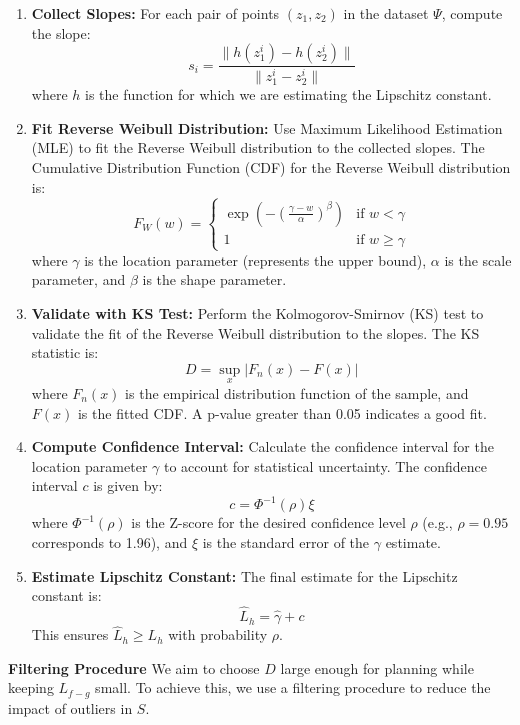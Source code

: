 \documentclass{article}
\begin{document}
\begin{enumerate}
    \item \textbf{Collect Slopes:} For each pair of points \((z_1, z_2)\) in the dataset \(\Psi\), compute the slope:
    \[
    s_i = \frac{\|h(z_1^i) - h(z_2^i)\|}{\|z_1^i - z_2^i\|}
    \]
    where \(h\) is the function for which we are estimating the Lipschitz constant.

    \item \textbf{Fit Reverse Weibull Distribution:} Use Maximum Likelihood Estimation (MLE) to fit the Reverse Weibull distribution to the collected slopes. The Cumulative Distribution Function (CDF) for the Reverse Weibull distribution is:
    \[
    F_W(w) = \begin{cases} 
    \exp \left( - \left( \frac{\gamma - w}{\alpha} \right)^\beta \right) & \text{if } w < \gamma \\
    1 & \text{if } w \geq \gamma 
    \end{cases}
    \]
    where \(\gamma\) is the location parameter (represents the upper bound), \(\alpha\) is the scale parameter, and \(\beta\) is the shape parameter.

    \item \textbf{Validate with KS Test:} Perform the Kolmogorov-Smirnov (KS) test to validate the fit of the Reverse Weibull distribution to the slopes. The KS statistic is:
    \[
    D = \sup_x |F_n(x) - F(x)|
    \]
    where \(F_n(x)\) is the empirical distribution function of the sample, and \(F(x)\) is the fitted CDF. A p-value greater than 0.05 indicates a good fit.

    \item \textbf{Compute Confidence Interval:} Calculate the confidence interval for the location parameter \(\gamma\) to account for statistical uncertainty. The confidence interval \(c\) is given by:
    \[
    c = \Phi^{-1}(\rho) \xi
    \]
    where \(\Phi^{-1}(\rho)\) is the Z-score for the desired confidence level \(\rho\) (e.g., \(\rho = 0.95\) corresponds to 1.96), and \(\xi\) is the standard error of the \(\gamma\) estimate.

    \item \textbf{Estimate Lipschitz Constant:} The final estimate for the Lipschitz constant is:
    \[
    \hat{L}_h = \hat{\gamma} + c
    \]
    This ensures \(\hat{L}_h \geq L_h\) with probability \(\rho\).
\end{enumerate}

\textbf{Filtering Procedure}
We aim to choose \( D \) large enough for planning while keeping \( L_{f-g} \) small. To achieve this, we use a filtering procedure to reduce the impact of outliers in \( S \).
\end{document}
